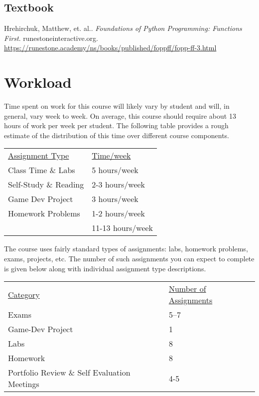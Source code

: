 \documentclass[10pt]{article}
\begin{document}
\subsection{Textbook}

\noindent
Hrehirchuk, Matthew, et. al.. \textit{Foundations of Python Programming: Functions First}.  runestoneinteractive.org. \url{https://runestone.academy/ns/books/published/foppff/fopp-ff-3.html} %


\section{Workload}


Time spent on work for this course will likely vary by student and will, in general, vary week to week. On average, this course should require about 13 hours of work per week per student.  The following table provides a rough estimate of the distribution of this time over different course components.
\begin{center}
\begin{tabular}{ll}
\underline{Assignment Type} & \underline{Time/week} \\
Class Time \& Labs       & 5 hours/week \\
Self-Study \& Reading & 2-3 hours/week \\
Game Dev Project           & 3 hours/week \\
Homework Problems   & 1-2 hours/week \\
\bottomrule
 & 11-13 hours/week
\end{tabular}
\end{center}


The course uses fairly standard types of assignments: labs, homework problems, exams, projects, etc. The number of such assignments you can expect to complete is given below along with individual assignment type descriptions.
\begin{center}
  \begin{tabular}{ll}
    \underline{Category} & \underline{Number of Assignments} \\
    Exams & 5--7 \\
    Game-Dev Project & 1 \\
    Labs & 8 \\
    Homework & 8 \\
    Portfolio Review \& Self Evaluation Meetings & 4-5
  \end{tabular}
\end{center}
\end{document}
